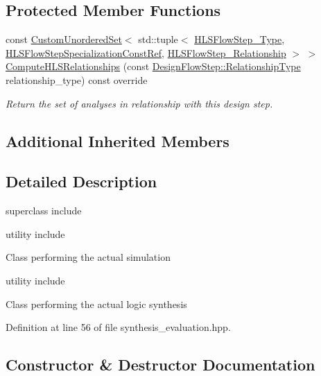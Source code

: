 \subsection*{Protected Member Functions}
\begin{DoxyCompactItemize}
\item 
const \hyperlink{classCustomUnorderedSet}{Custom\+Unordered\+Set}$<$ std\+::tuple$<$ \hyperlink{hls__step_8hpp_ada16bc22905016180e26fc7e39537f8d}{H\+L\+S\+Flow\+Step\+\_\+\+Type}, \hyperlink{hls__step_8hpp_a5fdd2edf290c196531d21d68e13f0e74}{H\+L\+S\+Flow\+Step\+Specialization\+Const\+Ref}, \hyperlink{hls__step_8hpp_a3ad360b9b11e6bf0683d5562a0ceb169}{H\+L\+S\+Flow\+Step\+\_\+\+Relationship} $>$ $>$ \hyperlink{classSynthesisEvaluation_a9507d25cab85fcb8631f712637b4707b}{Compute\+H\+L\+S\+Relationships} (const \hyperlink{classDesignFlowStep_a723a3baf19ff2ceb77bc13e099d0b1b7}{Design\+Flow\+Step\+::\+Relationship\+Type} relationship\+\_\+type) const override
\begin{DoxyCompactList}\small\item\em Return the set of analyses in relationship with this design step. \end{DoxyCompactList}\end{DoxyCompactItemize}
\subsection*{Additional Inherited Members}


\subsection{Detailed Description}
superclass include 

utility include

Class performing the actual simulation

utility include

Class performing the actual logic synthesis 

Definition at line 56 of file synthesis\+\_\+evaluation.\+hpp.



\subsection{Constructor \& Destructor Documentation}
\mbox{\label{classSynthesisEvaluation_aab6715194330034735598d4c877d84ca}} 
